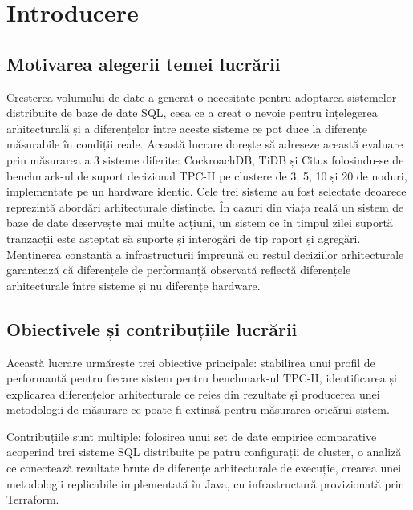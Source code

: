 \chapter{Introducere}

\section{Motivarea alegerii temei lucrării}

Creșterea volumului de date a generat o necesitate pentru adoptarea sistemelor distribuite de baze de date SQL, ceea ce a creat o nevoie pentru înțelegerea arhitecturală și a diferențelor între aceste sisteme ce pot duce la diferențe măsurabile în condiții reale. Această lucrare dorește să adreseze această evaluare prin măsurarea a 3 sisteme diferite: CockroachDB, TiDB și Citus folosindu-se de benchmark-ul de suport decizional TPC-H \cite{tpch} pe clustere de 3, 5, 10 și 20 de noduri, implementate pe un hardware identic. Cele trei sisteme au fost selectate deoarece reprezintă abordări arhitecturale distincte. În cazuri din viața reală un sistem de baze de date deservește mai multe acțiuni, un sistem ce în timpul zilei suportă tranzacții este așteptat să suporte și interogări de tip raport și agregări. Menținerea constantă a infrastructurii împreună cu restul deciziilor arhitecturale garantează că diferențele de performanță observată reflectă diferențele arhitecturale între sisteme și nu diferențe hardware.

\section{Obiectivele și contribuțiile lucrării}

Această lucrare urmărește trei obiective principale: stabilirea unui profil de performanță pentru fiecare sistem pentru benchmark-ul TPC-H, identificarea și explicarea diferențelor arhitecturale ce reies din rezultate și producerea unei metodologii de măsurare ce poate fi extinsă pentru măsurarea oricărui sistem.

Contribuțiile sunt multiple: folosirea unui set de date empirice comparative acoperind trei sisteme SQL distribuite pe patru configurații de cluster, o analiză ce conectează rezultate brute de diferențe arhitecturale de execuție, crearea unei metodologii replicabile implementată în Java, cu infrastructură provizionată prin Terraform.